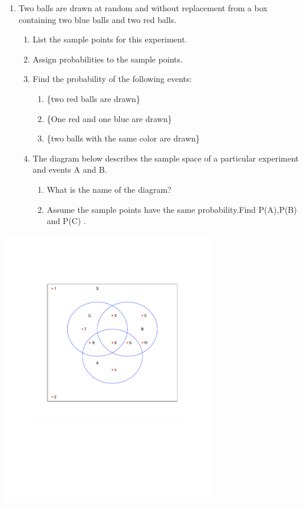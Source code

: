 \begin{enumerate}
\item Two balls are drawn at random and without replacement from a box containing two blue balls and two red balls.
\begin{enumerate}
\item List the sample points for this experiment.
\item Assign probabilities to the sample points.
\item Find the probability of the following events:
\begin{enumerate}
\item \{two red balls are drawn\}
\item \{One red and one blue are drawn\}
\item \{two balls with the same color are drawn\}
\end{enumerate}
\item The diagram below describes the sample space of a particular experiment and events A and B.
\begin{enumerate}
\item What is the name of the diagram?
\item Assume the sample points have the same probability.Find P(A),P(B) and P(C) .

\end{enumerate}
\end{enumerate}

\end{enumerate}
\includegraphics[height=12cm]{Section3/a2-fig-2}
